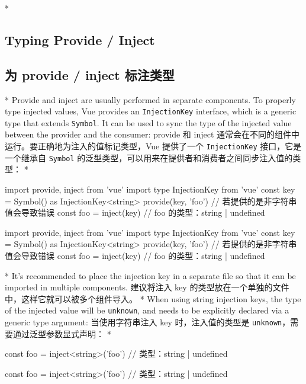 \begin{paracol}{2} 
 
\switchcolumn[0]*%
\subsection{Typing Provide / Inject}
\switchcolumn
\subsection{为 provide / inject 标注类型}
\switchcolumn[0]*%
Provide and inject are usually performed in separate components. To
properly type injected values, Vue provides an \texttt{InjectionKey}
interface, which is a generic type that extends \texttt{Symbol}. It can
be used to sync the type of the injected value between the provider and
the consumer:
\switchcolumn
provide 和 inject
通常会在不同的组件中运行。要正确地为注入的值标记类型，Vue 提供了一个
\texttt{InjectionKey} 接口，它是一个继承自 \texttt{Symbol}
的泛型类型，可以用来在提供者和消费者之间同步注入值的类型：
\switchcolumn[0]*%
\begin{codeTs}
import { provide, inject } from 'vue'
import type { InjectionKey } from 'vue'
const key = Symbol() as InjectionKey<string>
provide(key, 'foo') // 若提供的是非字符串值会导致错误
const foo = inject(key) // foo 的类型：string | undefined
\end{codeTs}
\switchcolumn
\begin{codeTs}
import { provide, inject } from 'vue'
import type { InjectionKey } from 'vue'
const key = Symbol() as InjectionKey<string>
provide(key, 'foo') // 若提供的是非字符串值会导致错误
const foo = inject(key) // foo 的类型：string | undefined
\end{codeTs}
\switchcolumn[0]*%
It's recommended to place the injection key in a separate file so that
it can be imported in multiple components.
\switchcolumn
建议将注入 key 的类型放在一个单独的文件中，这样它就可以被多个组件导入。
\switchcolumn[0]*%
When using string injection keys, the type of the injected value will be
\texttt{unknown}, and needs to be explicitly declared via a generic type
argument:
\switchcolumn
当使用字符串注入 key 时，注入值的类型是
\texttt{unknown}，需要通过泛型参数显式声明：
\switchcolumn[0]*%
\begin{codeTs}
const foo = inject<string>('foo') // 类型：string | undefined
\end{codeTs}
\switchcolumn
\begin{codeTs}
const foo = inject<string>('foo') // 类型：string | undefined

\end{codeTs}
\end{paracol}
